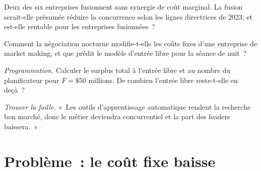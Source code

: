 \begin{exercise}[$\star\star$]\label{exo:fm:competition-and-the-future:5}
Deux des six entreprises fusionnent sans synergie de coût marginal. La fusion serait-elle présumée réduire la concurrence selon les lignes directrices de 2023, et
est-elle rentable pour les entreprises fusionnées~?
\end{exercise}

\begin{exercise}[$\star\star$]\label{exo:fm:competition-and-the-future:6}
Comment la négociation nocturne modifie-t-elle les coûts fixes d'une entreprise de market making, et que prédit le modèle d'entrée libre pour la séance de nuit~?
\end{exercise}

\begin{exercise}[$\star\star\star$]\label{exo:fm:competition-and-the-future:7}
\emph{Programmation.} Calculer le surplus total à l'entrée libre et au nombre du planificateur pour $F=\$50$ millions. De combien l'entrée libre reste-t-elle en deçà~?
\end{exercise}

\begin{exercise}[$\star\star\star$]\label{exo:fm:competition-and-the-future:8}
\emph{Trouver la faille.} «~Les outils d'apprentissage automatique rendent la recherche bon marché, donc le métier deviendra concurrentiel et la part des leaders baissera.~»
\end{exercise}

\section{Problème~: le coût fixe baisse}

